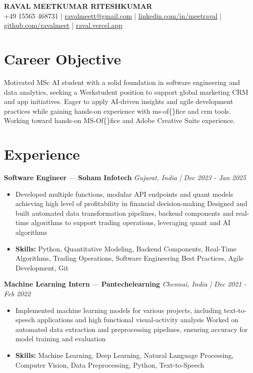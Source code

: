\documentclass[a4paper,10pt]{article}
\begin{document}
\begin{center}
  {\Large\bfseries RAVAL MEETKUMAR RITESHKUMAR}\\[2pt]
  {\small +49 15565 468731 \;|\; \href{mailto:ravalmeett@gmail.com}{ravalmeett@gmail.com} \;|\; \href{https://www.linkedin.com/in/meetraval/}{linkedin.com/in/meetraval} \;|\; \href{https://github.com/ravalmeet}{github.com/ravalmeet} \;|\; \href{https://raval.vercel.app/}{raval.vercel.app}}
\end{center}
\vspace{-3pt}

\section*{Career Objective}
Motivated MSc AI student with a solid foundation in software engineering and data analytics, seeking a Werkstudent position to support global marketing CRM and app initiatives. Eager to apply AI-driven insights and agile development practices while gaining hands-on experience with ms-of\{\}fice and crm tools. Working toward hands-on MS-Of\{\}fice and Adobe Creative Suite experience.\par

\section*{Experience}
\textbf{Software Engineer} — \textbf{Soham Infotech} \hfill \textit{Gujarat, India \;|\; Dec 2023 - Jan 2025}\par
\vspace{1pt}
\begin{itemize}
  \item Developed multiple functions, modular API endpoints and quant models achieving high level of profitability in financial decision-making Designed and built automated data transformation pipelines, backend components and real-time algorithms to support trading operations, leveraging quant and AI algorithms
  \item \textbf{Skills:} Python, Quantitative Modeling, Backend Components, Real-Time Algorithms, Trading Operations, Software Engineering Best Practices, Agile Development, Git
\end{itemize}
\vspace{3pt}
\textbf{Machine Learning Intern} — \textbf{Pantechelearning} \hfill \textit{Chennai, India \;|\; Dec 2021 - Feb 2022}\par
\vspace{1pt}
\begin{itemize}
  \item Implemented machine learning models for various projects, including text-to-speech applications and high functional visual-activity analysis Worked on automated data extraction and preprocessing pipelines, ensuring accuracy for model training and evaluation
  \item \textbf{Skills:} Machine Learning, Deep Learning, Natural Language Processing, Computer Vision, Data Preprocessing, Python, Text-to-Speech
\end{itemize}
\end{document}

